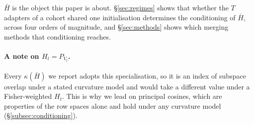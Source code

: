 $\bar H$ is the object this paper is about. \S\ref{sec:regimes} shows that
whether the $T$ adapters of a cohort shared one initialisation determines the
conditioning of $\bar H$, across four orders of magnitude, and
\S\ref{sec:methods} shows which merging methods that conditioning reaches.

\paragraph{A note on $H_t = P_{V_t}$.} Every $\kappa(\bar H)$ we report adopts
this specialisation, so it is an index of subspace overlap under a stated
curvature model and would take a different value under a Fisher-weighted
$H_t$. This is why we lead on principal cosines, which are properties of the
row spaces alone and hold under any curvature model
(\S\ref{subsec:conditioning}).
